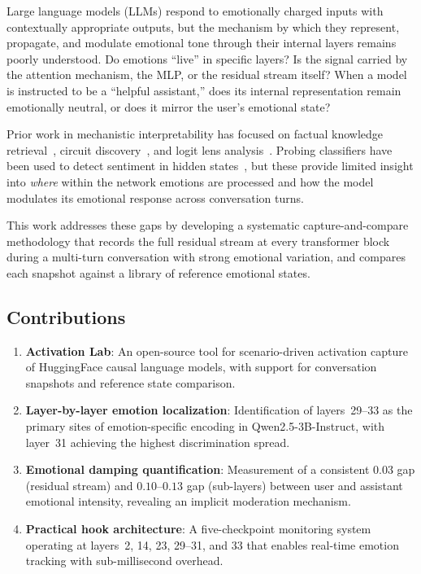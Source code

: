 \documentclass[11pt,a4paper]{article}
\begin{document}
Large language models (LLMs) respond to emotionally charged inputs with contextually appropriate outputs, but the mechanism by which they represent, propagate, and modulate emotional tone through their internal layers remains poorly understood. Do emotions ``live'' in specific layers? Is the signal carried by the attention mechanism, the MLP, or the residual stream itself? When a model is instructed to be a ``helpful assistant,'' does its internal representation remain emotionally neutral, or does it mirror the user's emotional state?

Prior work in mechanistic interpretability has focused on factual knowledge retrieval~\citep{meng2022locating}, circuit discovery~\citep{olah2020zoom}, and logit lens analysis~\citep{nostalgebraist2020logitlens}. Probing classifiers have been used to detect sentiment in hidden states~\citep{conneau2018probing}, but these provide limited insight into \emph{where} within the network emotions are processed and how the model modulates its emotional response across conversation turns.

This work addresses these gaps by developing a systematic capture-and-compare methodology that records the full residual stream at every transformer block during a multi-turn conversation with strong emotional variation, and compares each snapshot against a library of reference emotional states.

\subsection{Contributions}

\begin{enumerate}[leftmargin=*]
  \item \textbf{Activation Lab}: An open-source tool for scenario-driven activation capture of HuggingFace causal language models, with support for conversation snapshots and reference state comparison.
  \item \textbf{Layer-by-layer emotion localization}: Identification of layers~29--33 as the primary sites of emotion-specific encoding in Qwen2.5-3B-Instruct, with layer~31 achieving the highest discrimination spread.
  \item \textbf{Emotional damping quantification}: Measurement of a consistent $0.03$ gap (residual stream) and $0.10$--$0.13$ gap (sub-layers) between user and assistant emotional intensity, revealing an implicit moderation mechanism.
  \item \textbf{Practical hook architecture}: A five-checkpoint monitoring system operating at layers~2, 14, 23, 29--31, and 33 that enables real-time emotion tracking with sub-millisecond overhead.
\end{enumerate}
\end{document}
